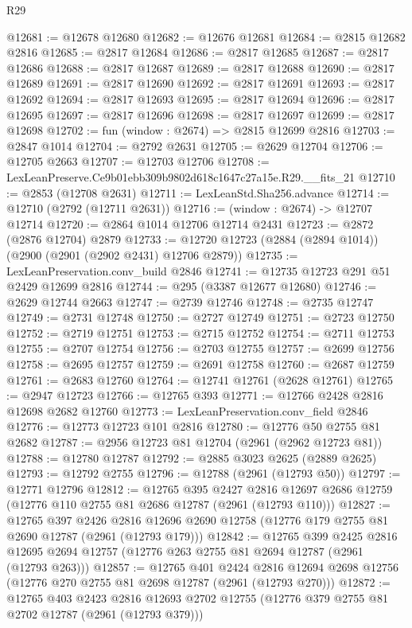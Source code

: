 \begin{lexlean}{R29}
\begin{coremodule}
@12681 := @12678 @12680
@12682 := @12676 @12681
@12684 := @2815 @12682 @2816
@12685 := @2817 @12684
@12686 := @2817 @12685
@12687 := @2817 @12686
@12688 := @2817 @12687
@12689 := @2817 @12688
@12690 := @2817 @12689
@12691 := @2817 @12690
@12692 := @2817 @12691
@12693 := @2817 @12692
@12694 := @2817 @12693
@12695 := @2817 @12694
@12696 := @2817 @12695
@12697 := @2817 @12696
@12698 := @2817 @12697
@12699 := @2817 @12698
@12702 := fun (window : @2674) => @2815 @12699 @2816
@12703 := @2847 @1014
@12704 := @2792 @2631
@12705 := @2629 @12704
@12706 := @12705 @2663
@12707 := @12703 @12706
@12708 := LexLeanPreserve.Ce9b01ebb309b9802d618c1647c27a15e.R29.__fits_21
@12710 := @2853 (@12708 @2631)
@12711 := LexLeanStd.Sha256.advance
@12714 := @12710 (@2792 (@12711 @2631))
@12716 := (window : @2674) -> @12707 @12714
@12720 := @2864 @1014 @12706 @12714 @2431
@12723 := @2872 (@2876 @12704) @2879
@12733 := @12720 @12723 (@2884 (@2894 @1014)) (@2900 (@2901 (@2902 @2431) @12706 @2879))
@12735 := LexLeanPreservation.conv_build @2846
@12741 := @12735 @12723 @291 @51 @2429 @12699 @2816
@12744 := @295 (@3387 @12677 @12680)
@12746 := @2629 @12744 @2663
@12747 := @2739 @12746
@12748 := @2735 @12747
@12749 := @2731 @12748
@12750 := @2727 @12749
@12751 := @2723 @12750
@12752 := @2719 @12751
@12753 := @2715 @12752
@12754 := @2711 @12753
@12755 := @2707 @12754
@12756 := @2703 @12755
@12757 := @2699 @12756
@12758 := @2695 @12757
@12759 := @2691 @12758
@12760 := @2687 @12759
@12761 := @2683 @12760
@12764 := @12741 @12761 (@2628 @12761)
@12765 := @2947 @12723
@12766 := @12765 @393
@12771 := @12766 @2428 @2816 @12698 @2682 @12760
@12773 := LexLeanPreservation.conv_field @2846
@12776 := @12773 @12723 @101 @2816
@12780 := @12776 @50 @2755 @81 @2682
@12787 := @2956 @12723 @81 @12704 (@2961 (@2962 @12723 @81))
@12788 := @12780 @12787
@12792 := @2885 @3023 @2625 (@2889 @2625)
@12793 := @12792 @2755
@12796 := @12788 (@2961 (@12793 @50))
@12797 := @12771 @12796
@12812 := @12765
    @395
    @2427
    @2816
    @12697
    @2686
    @12759
    (@12776 @110 @2755 @81 @2686 @12787 (@2961 (@12793 @110)))
@12827 := @12765
    @397
    @2426
    @2816
    @12696
    @2690
    @12758
    (@12776 @179 @2755 @81 @2690 @12787 (@2961 (@12793 @179)))
@12842 := @12765
    @399
    @2425
    @2816
    @12695
    @2694
    @12757
    (@12776 @263 @2755 @81 @2694 @12787 (@2961 (@12793 @263)))
@12857 := @12765
    @401
    @2424
    @2816
    @12694
    @2698
    @12756
    (@12776 @270 @2755 @81 @2698 @12787 (@2961 (@12793 @270)))
@12872 := @12765
    @403
    @2423
    @2816
    @12693
    @2702
    @12755
    (@12776 @379 @2755 @81 @2702 @12787 (@2961 (@12793 @379)))

\end{coremodule}
\end{lexlean}
